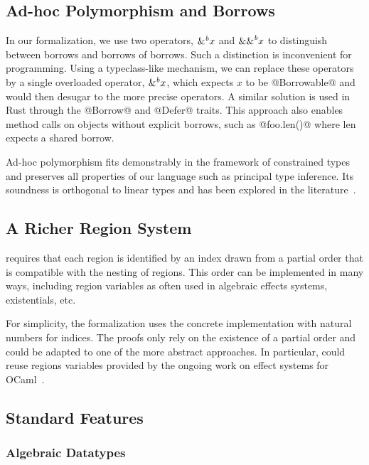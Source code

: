 \subsection{Ad-hoc Polymorphism and Borrows}

In our formalization, we use two operators, ${\&}^{\textit{b}}x$ and ${\&\&}^{\textit{b}}x$ to
distinguish between borrows and borrows of borrows.
Such a distinction is inconvenient for programming.
Using a typeclass-like mechanism, we can replace these operators
by a single overloaded operator, ${\&}^{\textit{b}}x$, which expects $x$ to be @Borrowable@ and
would then desugar to the more precise operators.
A similar solution is used in Rust through the @Borrow@ and @Defer@
traits.
This approach also enables method calls on objects without
explicit borrows, such as @foo.len()@ where len expects a shared borrow.

Ad-hoc polymorphism fits demonstrably in the \hmx framework of constrained
types and preserves all properties of our language such
as principal type inference. Its soundness is orthogonal to linear types
and has been explored in the literature~\citep{DBLP:conf/fpca/OderskyWW95}.

\subsection{A Richer Region System}

\lang requires that each region is identified by an index drawn from a partial
order that is compatible with the nesting of regions.
This order can be implemented in many ways, including region variables
as often used in algebraic effects systems, existentials, etc.

For simplicity, the formalization uses the concrete implementation with 
natural numbers for indices. The proofs only rely on
the existence of a partial order and could be adapted to one of the
more abstract approaches.
In particular, \lang could reuse regions variables provided by
the ongoing work on effect systems
for OCaml~\cite{DBLP:conf/sfp/DolanEHMSW17}.

\subsection{Standard Features}

\subsubsection*{Algebraic Datatypes}

